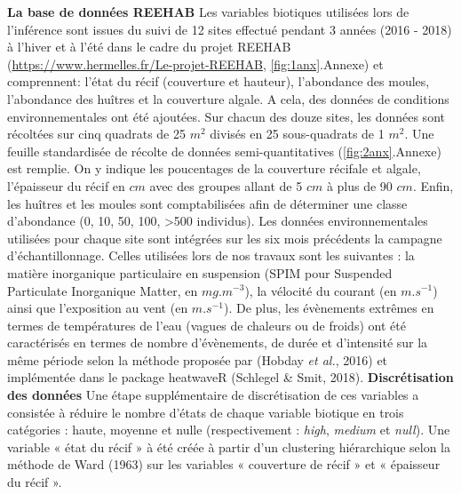 \documentclass[12pt]{report}
\begin{document}
\newline \newline
\textbf{La base de données REEHAB} Les variables biotiques utilisées lors de l’inférence sont issues du suivi de 12 sites effectué pendant 3 années (2016 - 2018) à l'hiver et à l'été dans le cadre du projet REEHAB (\href{https://www.hermelles.fr/Le-projet-REEHAB}{https://www.hermelles.fr/Le-projet-REEHAB}, \autoref{fig:1anx}.Annexe) et comprennent: l’état du récif (couverture et hauteur), l’abondance des moules, l’abondance des huîtres et la couverture algale. A cela, des données de conditions environnementales ont été ajoutées. Sur chacun des douze sites, les données sont récoltées sur cinq quadrats de 25 $m^2$ divisés en 25 sous-quadrats de 1 $m^2$. Une feuille standardisée de récolte de données semi-quantitatives (\autoref{fig:2anx}.Annexe) est remplie. On y indique les poucentages de la couverture récifale et algale, l'épaisseur du récif en $cm$ avec des groupes allant de 5 $cm$ à plus de 90 $cm$. Enfin, les huîtres et les moules sont comptabilisées afin de déterminer une classe d'abondance (0, 10, 50, 100, >500 individus). Les données environnementales utilisées pour chaque site sont intégrées sur les six mois précédents la campagne d'échantillonnage. Celles utilisées lors de nos travaux sont les suivantes : la matière inorganique particulaire en suspension (SPIM pour Suspended Particulate Inorganique Matter, en $mg.m^{-3}$), la vélocité du courant (en $m.s^{-1}$) ainsi que l’exposition au vent (en $m.s^{-1}$). De plus, les évènements extrêmes en termes de températures de l’eau (vagues de chaleurs ou de froids) ont été caractérisés en termes de nombre d’évènements, de durée et d’intensité sur la même période selon la méthode proposée par (Hobday \textit{et al.}, 2016) et implémentée dans le package heatwaveR (Schlegel \& Smit, 2018).
\newline \newline
\textbf{Discrétisation des données} Une étape supplémentaire de discrétisation de ces variables a consistée à réduire le nombre d’états de chaque variable biotique en trois catégories : haute, moyenne et nulle (respectivement : \textit{high}, \textit{medium} et \textit{null}). Une variable « état du récif » à été créée à partir d’un clustering hiérarchique selon la méthode de Ward (1963) sur les variables « couverture de récif » et « épaisseur du récif ».
\newline \newline
\end{document}
